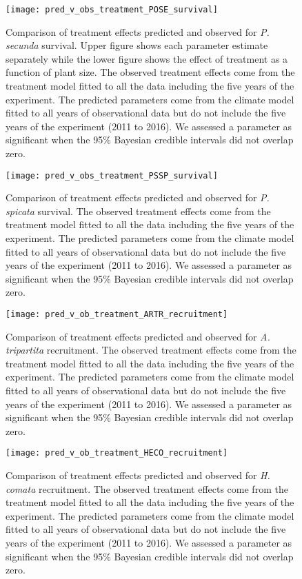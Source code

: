 \documentclass[11pt]{article}
\begin{document}
\begin{figure}[!htbp]
	\centering
	\texttt{[image: pred\_v\_obs\_treatment\_POSE\_survival]}
	\caption{Comparison of treatment effects predicted and observed for \textit{P. secunda} survival.  Upper figure shows each parameter estimate separately while the lower figure shows the effect of treatment as a function of plant size.  The observed treatment effects come from the treatment model fitted to all the data including the five years of the experiment.  The predicted parameters come from the climate model fitted to all years of observational data but do not include the five years of the experiment (2011 to 2016). We assessed a parameter as significant when the 95\% Bayesian credible intervals did not overlap zero.}
	\label{fig:parPredPOSESurvival}
\end{figure}

\begin{figure}[!htbp]
	\centering
	\texttt{[image: pred\_v\_obs\_treatment\_PSSP\_survival]}
	\caption{Comparison of treatment effects predicted and observed for \textit{P. spicata} survival.  The observed treatment effects come from the treatment model fitted to all the data including the five years of the experiment.  The predicted parameters come from the climate model fitted to all years of observational data but do not include the five years of the experiment (2011 to 2016). We assessed a parameter as significant when the 95\% Bayesian credible intervals did not overlap zero.}
	\label{fig:parPredPSSPSurvival}
\end{figure}


\begin{figure}[!htbp]
	\centering
	\texttt{[image: pred\_v\_ob\_treatment\_ARTR\_recruitment]}
	\caption{Comparison of treatment effects predicted and observed for \textit{A. tripartita} recruitment.  The observed treatment effects come from the treatment model fitted to all the data including the five years of the experiment.  The predicted parameters come from the climate model fitted to all years of observational data but do not include the five years of the experiment (2011 to 2016). We assessed a parameter as significant when the 95\% Bayesian credible intervals did not overlap zero.}
	\label{fig:parPredARTRRecruitment}
\end{figure}

\begin{figure}[!htbp]
	\centering
	\texttt{[image: pred\_v\_ob\_treatment\_HECO\_recruitment]}
	\caption{Comparison of treatment effects predicted and observed for \textit{H. comata} recruitment.  The observed treatment effects come from the treatment model fitted to all the data including the five years of the experiment.  The predicted parameters come from the climate model fitted to all years of observational data but do not include the five years of the experiment (2011 to 2016). We assessed a parameter as significant when the 95\% Bayesian credible intervals did not overlap zero.}
	\label{fig:parPredHECORecruitment}
\end{figure}
\end{document}
